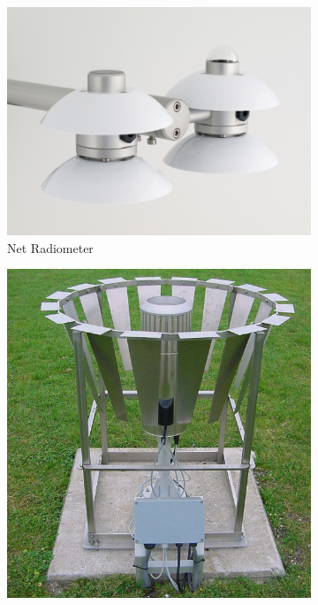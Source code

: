 \documentclass[a4paper]{book}
\begin{document}
\begin{figure}
    \centering
    \begin{subfigure}[t]{0.4\textwidth}
        \centering
        \includegraphics[width=\textwidth]{images/net_radiometer}
        \caption{Net Radiometer}
        \label{fig:net_radiometer}
    \end{subfigure}
    \hfill
    \begin{subfigure}[t]{0.28\textwidth}
        \centering
        \includegraphics[width=\textwidth]{images/rain_gauge_shield}

\end{subfigure}
\end{figure}
\end{document}
